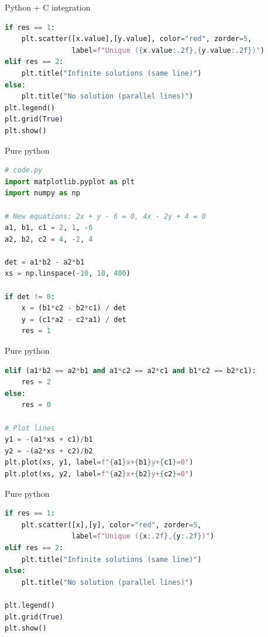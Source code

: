 \documentclass{beamer}
\begin{document}
\begin{frame}[fragile]{Python + C integration }
\begin{lstlisting}[language=Python]
if res == 1:
    plt.scatter([x.value],[y.value], color="red", zorder=5,
                label=f"Unique ({x.value:.2f},{y.value:.2f})")
elif res == 2:
    plt.title("Infinite solutions (same line)")
else:
    plt.title("No solution (parallel lines)")
plt.legend()
plt.grid(True)
plt.show()
\end{lstlisting}
\end{frame}
\begin{frame}[fragile]{Pure python}
\begin{lstlisting}[language=Python]
# code.py
import matplotlib.pyplot as plt
import numpy as np

# New equations: 2x + y - 6 = 0, 4x - 2y + 4 = 0
a1, b1, c1 = 2, 1, -6
a2, b2, c2 = 4, -2, 4

det = a1*b2 - a2*b1
xs = np.linspace(-10, 10, 400)

if det != 0:
    x = (b1*c2 - b2*c1) / det
    y = (c1*a2 - c2*a1) / det
    res = 1
\end{lstlisting}
\end{frame}

\begin{frame}[fragile]{Pure python}
\begin{lstlisting}[language=Python]
elif (a1*b2 == a2*b1 and a1*c2 == a2*c1 and b1*c2 == b2*c1):
    res = 2
else:
    res = 0

# Plot lines
y1 = -(a1*xs + c1)/b1
y2 = -(a2*xs + c2)/b2
plt.plot(xs, y1, label=f"{a1}x+{b1}y+{c1}=0")
plt.plot(xs, y2, label=f"{a2}x+{b2}y+{c2}=0")
\end{lstlisting}
\end{frame}

\begin{frame}[fragile]{Pure python}
\begin{lstlisting}[language=Python]
if res == 1:
    plt.scatter([x],[y], color="red", zorder=5, 
                label=f"Unique ({x:.2f},{y:.2f})")
elif res == 2:
    plt.title("Infinite solutions (same line)")
else:
    plt.title("No solution (parallel lines)")

plt.legend()
plt.grid(True)
plt.show()
\end{lstlisting}
\end{frame}
\end{document}
